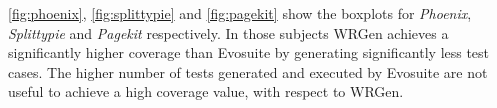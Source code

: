 
\begin{figure}[H]
	\centering
	
	
\end{figure}
\begin{figure}[H]
	\centering
	
\end{figure}

\autoref{fig:phoenix}, \autoref{fig:splittypie} and \autoref{fig:pagekit} show the boxplots for \textit{Phoenix}, \textit{Splittypie} and \textit{Pagekit} respectively. In those subjects WRGen achieves a significantly higher coverage than Evosuite by generating significantly less test cases. The higher number of tests generated and executed by Evosuite are not useful to achieve a high coverage value, with respect to WRGen.

\newpage